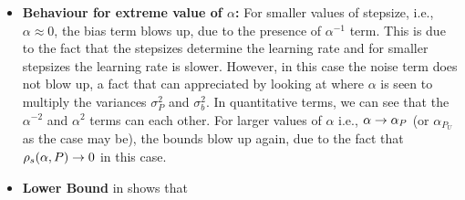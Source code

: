 \begin{itemize}[leftmargin=*, before = \leavevmode\vspace{-\baselineskip}]
\item \textbf{Behaviour for extreme value of $\alpha$:} For smaller values of stepsize, i.e., $\alpha\approx 0$, the bias term blows up, due to the presence of $\alpha^{-1}$ term. This is due to the fact that the stepsizes determine the learning rate and for smaller stepsizes the learning rate is slower. However, in this case the noise term does not blow up, a fact that can appreciated by looking at  where $\alpha$ is seen to multiply the variances $\sigma^2_P$ and $\sigma^2_b$. In quantitative terms, we can see that the $\alpha^{-2}$ and $\alpha^2$ terms can each other. For larger values of $\alpha$ i.e., $\alpha\rightarrow \alpha_{P}$ (or $\alpha_{P_U}$ as the case may be), the bounds blow up again, due to the fact that $\rho_s(\alpha,P)\rightarrow 0$ in this case.
\item \textbf{Lower Bound} in  shows that
\end{itemize}

